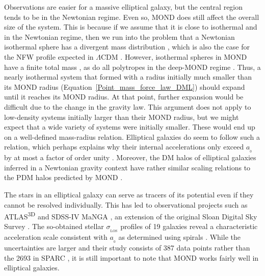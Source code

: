 \documentclass[fleqn,usenatbib,useAMS]{mnras} %
\begin{document}
Observations are easier for a massive elliptical galaxy, but the central region tends to be in the Newtonian regime. Even so, MOND does still affect the overall size of the system. This is because if we assume that it is close to isothermal and in the Newtonian regime, then we run into the problem that a Newtonian isothermal sphere has a divergent mass distribution \citep{Galactic_Dynamics}, which is also the case for the NFW profile expected in $\Lambda$CDM \citep*{Navarro_1997}. However, isothermal spheres in MOND have a finite total mass \citep{Milgrom_1984}, as do all polytropes in the deep-MOND regime \citep{Milgrom_2021_polytropes}. Thus, a nearly isothermal system that formed with a radius initially much smaller than its MOND radius (Equation~\ref{Point_mass_force_law_DML}) should expand until it reaches its MOND radius. At that point, further expansion would be difficult due to the change in the gravity law. This argument does not apply to low-density systems initially larger than their MOND radius, but we might expect that a wide variety of systems were initially smaller. These would end up on a well-defined mass-radius relation. Elliptical galaxies do seem to follow such a relation, which perhaps explains why their internal accelerations only exceed $a_{_0}$ by at most a factor of order unity \citep{Sanders_2000}. Moreover, the DM halos of elliptical galaxies inferred in a Newtonian gravity context have rather similar scaling relations to the PDM halos predicted by MOND \citep{Richtler_2011}.

The stars in an elliptical galaxy can serve as tracers of its potential even if they cannot be resolved individually. This has led to observational projects such as ATLAS\textsuperscript{3D} \citep{Cappellari_2013} and SDSS-IV MaNGA \citep{Bundy_2015}, an extension of the original Sloan Digital Sky Survey \citep[SDSS;][]{SDSS}. The so-obtained stellar $\sigma_{_\text{LOS}}$ profiles of 19 galaxies reveal a characteristic acceleration scale consistent with $a_{_0}$ as determined using spirals \citep{Chae_2020_elliptical}. While the uncertainties are larger and their study consists of 387 data points rather than the 2693 in SPARC \citep{SPARC}, it is still important to note that MOND works fairly well in elliptical galaxies.
\end{document}
